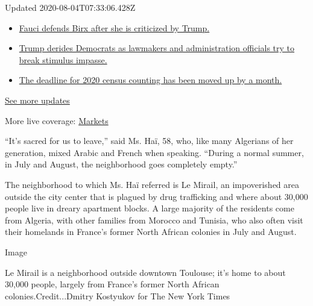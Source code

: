 Updated 2020-08-04T07:33:06.428Z

\begin{itemize}
\tightlist
\item
  \href{https://www.nytimes3xbfgragh.onion/2020/08/03/world/coronavirus-covid-19.html?action=click\&pgtype=Article\&state=default\&region=MAIN_CONTENT_1\&context=storylines_live_updates\#link-4547638f}{Fauci
  defends Birx after she is criticized by Trump.}
\item
  \href{https://www.nytimes3xbfgragh.onion/2020/08/03/world/coronavirus-covid-19.html?action=click\&pgtype=Article\&state=default\&region=MAIN_CONTENT_1\&context=storylines_live_updates\#link-15e7f995}{Trump
  derides Democrats as lawmakers and administration officials try to
  break stimulus impasse.}
\item
  \href{https://www.nytimes3xbfgragh.onion/2020/08/03/world/coronavirus-covid-19.html?action=click\&pgtype=Article\&state=default\&region=MAIN_CONTENT_1\&context=storylines_live_updates\#link-e5a2cda}{The
  deadline for 2020 census counting has been moved up by a month.}
\end{itemize}

\href{https://www.nytimes3xbfgragh.onion/2020/08/03/world/coronavirus-covid-19.html?action=click\&pgtype=Article\&state=default\&region=MAIN_CONTENT_1\&context=storylines_live_updates}{See
more updates}

More live coverage:
\href{https://www.nytimes3xbfgragh.onion/live/2020/08/03/business/stock-market-today-coronavirus?action=click\&pgtype=Article\&state=default\&region=MAIN_CONTENT_1\&context=storylines_live_updates}{Markets}

``It's sacred for us to leave,'' said Ms. Haï, 58, who, like many
Algerians of her generation, mixed Arabic and French when speaking.
``During a normal summer, in July and August, the neighborhood goes
completely empty.''

The neighborhood to which Ms. Haï referred is Le Mirail, an impoverished
area outside the city center that is plagued by drug trafficking and
where about 30,000 people live in dreary apartment blocks. A large
majority of the residents come from Algeria, with other families from
Morocco and Tunisia, who also often visit their homelands in France's
former North African colonies in July and August.

Image

Le Mirail is a neighborhood outside downtown Toulouse; it's home to
about 30,000 people, largely from France's former North African
colonies.Credit...Dmitry Kostyukov for The New York Times

